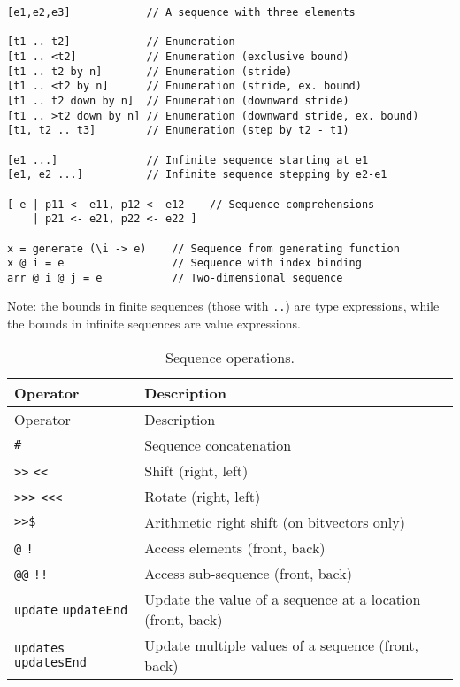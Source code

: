 \begin{verbatim}
[e1,e2,e3]            // A sequence with three elements

[t1 .. t2]            // Enumeration
[t1 .. <t2]           // Enumeration (exclusive bound)
[t1 .. t2 by n]       // Enumeration (stride)
[t1 .. <t2 by n]      // Enumeration (stride, ex. bound)
[t1 .. t2 down by n]  // Enumeration (downward stride)
[t1 .. >t2 down by n] // Enumeration (downward stride, ex. bound)
[t1, t2 .. t3]        // Enumeration (step by t2 - t1)

[e1 ...]              // Infinite sequence starting at e1
[e1, e2 ...]          // Infinite sequence stepping by e2-e1

[ e | p11 <- e11, p12 <- e12    // Sequence comprehensions
    | p21 <- e21, p22 <- e22 ]

x = generate (\i -> e)    // Sequence from generating function
x @ i = e                 // Sequence with index binding
arr @ i @ j = e           // Two-dimensional sequence
\end{verbatim}

Note: the bounds in finite sequences (those with \texttt{..}) are type
expressions, while the bounds in infinite sequences are value
expressions.

\begin{longtable}[]{@{}ll@{}}
\caption{Sequence operations.}\tabularnewline
\toprule
Operator & Description \\
\midrule
\endfirsthead
\toprule
Operator & Description \\
\midrule
\endhead
\texttt{\#} & Sequence concatenation \\
\texttt{\textgreater{}\textgreater{}} \texttt{\textless{}\textless{}} &
Shift (right, left) \\
\texttt{\textgreater{}\textgreater{}\textgreater{}}
\texttt{\textless{}\textless{}\textless{}} & Rotate (right, left) \\
\texttt{\textgreater{}\textgreater{}\$} & Arithmetic right shift (on
bitvectors only) \\
\texttt{@} \texttt{!} & Access elements (front, back) \\
\texttt{@@} \texttt{!!} & Access sub-sequence (front, back) \\
\texttt{update} \texttt{updateEnd} & Update the value of a sequence at a
location (front, back) \\
\texttt{updates} \texttt{updatesEnd} & Update multiple values of a
sequence (front, back) \\
\bottomrule
\end{longtable}

